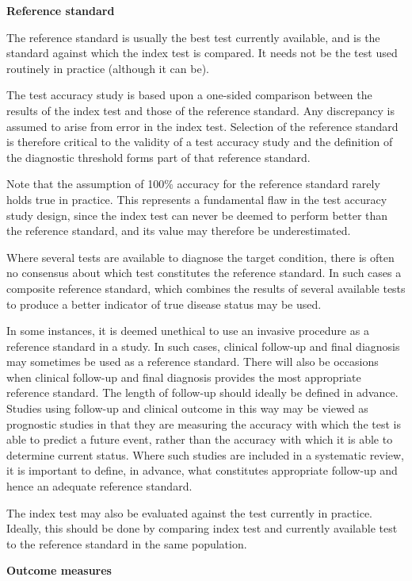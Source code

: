 \documentclass[
  11pt,
  a4paper,
  DIV=11,
  numbers=noendperiod]{scrreprt}
\begin{document}
\textbf{Reference standard}

The reference standard is usually the best test currently available, and
is the standard against which the index test is compared. It needs not
be the test used routinely in practice (although it can be).

The test accuracy study is based upon a one-sided comparison between the
results of the index test and those of the reference standard. Any
discrepancy is assumed to arise from error in the index test. Selection
of the reference standard is therefore critical to the validity of a
test accuracy study and the definition of the diagnostic threshold forms
part of that reference standard.

Note that the assumption of 100\% accuracy for the reference standard
rarely holds true in practice. This represents a fundamental flaw in the
test accuracy study design, since the index test can never be deemed to
perform better than the reference standard, and its value may therefore
be underestimated.

Where several tests are available to diagnose the target condition,
there is often no consensus about which test constitutes the reference
standard. In such cases a composite reference standard, which combines
the results of several available tests to produce a better indicator of
true disease status may be used.

In some instances, it is deemed unethical to use an invasive procedure
as a reference standard in a study. In such cases, clinical follow-up
and final diagnosis may sometimes be used as a reference standard. There
will also be occasions when clinical follow-up and final diagnosis
provides the most appropriate reference standard. The length of
follow-up should ideally be defined in advance. Studies using follow-up
and clinical outcome in this way may be viewed as prognostic studies in
that they are measuring the accuracy with which the test is able to
predict a future event, rather than the accuracy with which it is able
to determine current status. Where such studies are included in a
systematic review, it is important to define, in advance, what
constitutes appropriate follow-up and hence an adequate reference
standard.

The index test may also be evaluated against the test currently in
practice. Ideally, this should be done by comparing index test and
currently available test to the reference standard in the same
population.

\textbf{Outcome measures}
\end{document}
